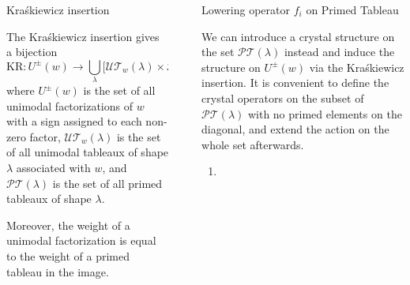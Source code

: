 \documentclass[final]{beamer}
\theoremstyle{definition}
\numberwithin{equation}{section}
\newlength{\sepwid}
\newlength{\onecolwid}
\newlength{\twocolwid}
\begin{document}
\begin{frame}[t]
\begin{columns}[t]
\begin{column}{\twocolwid}
\begin{columns}[t]
\begin{column}{\onecolwid}
\begin{alertblock}{Kra\'skiewicz insertion}

The Kra\'skiewicz insertion gives a bijection 
\begin{equation*}
\mathrm{KR}\colon U^{\pm}(w) \rightarrow \bigcup_{\lambda} \big[\mathcal{UT}_w (\lambda) \times \mathcal{PT} (\lambda)\big],
\end{equation*}
where $U^{\pm}(w)$ is the set of all unimodal factorizations of $w$ with a sign assigned to each non-zero factor, $\mathcal{UT}_w (\lambda)$ is the set of all unimodal tableaux of shape $\lambda$ associated with $w$, and $\mathcal{PT} (\lambda)$ is the set of all primed tableaux of shape $\lambda$.

Moreover, the weight of a unimodal factorization is equal to the weight of a primed tableau in the image.

\end{alertblock}

\end{column} %

\end{columns}

\end{column}

\begin{column}{\sepwid}\end{column} %

\begin{column}{\onecolwid} %


\begin{block}{Lowering operator $f_i$ on Primed Tableau}

We can introduce a crystal structure on the set $\mathcal{PT} (\lambda)$ instead and induce the structure on $U^{\pm}(w)$ via the Kra\'skiewicz insertion. It is convenient to define the crystal operators on the subset of $\mathcal{PT} (\lambda)$ with no primed elements on the diagonal, and extend the action on the whole set afterwards.

\begin{enumerate}

\item 

\end{enumerate}



\end{block}
\end{column}
\end{columns}
\end{frame}
\end{document}
